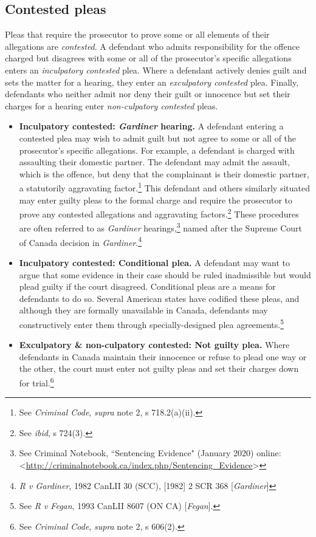 \subsection{Contested pleas}

Pleas that require the prosecutor to prove some or all elements of their allegations are \textit{contested}. A defendant who admits responsibility for the offence charged but disagrees with some or all of the prosecutor's specific allegations enters an \textit{inculpatory contested} plea. Where a defendant actively denies guilt and sets the matter for a hearing, they enter an \textit{exculpatory contested} plea. Finally, defendants who neither admit nor deny their guilt or innocence but set their charges for a hearing enter \textit{non-culpatory contested} pleas.

\begin{itemize}
    \item \textbf{Inculpatory contested: \textit{Gardiner} hearing.} A defendant entering a contested plea may wish to admit guilt but not agree to some or all of the prosecutor's specific allegations. For example, a defendant is charged with assaulting their domestic partner. The defendant may admit the assault, which is the offence, but deny that the complainant is their domestic partner, a statutorily aggravating factor.\footnote{See \textit{Criminal Code}, \textit{supra} note 2, s 718.2(a)(ii).} This defendant and others similarly situated may enter guilty pleas to the formal charge and require the prosecutor to prove any contested allegations and aggravating factors.\footnote{See \textit{ibid}, s 724(3).} These procedures are often referred to as \textit{Gardiner} hearings,\footnote{See Criminal Notebook, ``Sentencing Evidence" (January 2020) online: \textless \url{http://criminalnotebook.ca/index.php/Sentencing_Evidence}\textgreater} named after the Supreme Court of Canada decision in \textit{Gardiner}.\footnote{\textit{R v Gardiner}, 1982 CanLII 30 (SCC), [1982] 2 SCR 368 [\textit{Gardiner}]}
    
    \item \textbf{Inculpatory contested: Conditional plea.} A defendant may want to argue that some evidence in their case should be ruled inadmissible but would plead guilty if the court disagreed. Conditional pleas are a means for defendants to do so. Several American states have codified these pleas, and although they are formally unavailable in Canada, defendants may constructively enter them through specially-designed plea agreements.\footnote{See \textit{R v Fegan}, 1993 CanLII 8607 (ON CA) [\textit{Fegan}].}
    
    \item \textbf{Exculpatory \& non-culpatory contested: Not guilty plea.} Where defendants in Canada maintain their innocence or refuse to plead one way or the other, the court must enter not guilty pleas and set their charges down for trial.\footnote{See \textit{Criminal Code}, \textit{supra} note 2, s 606(2).} 
    
\end{itemize}

